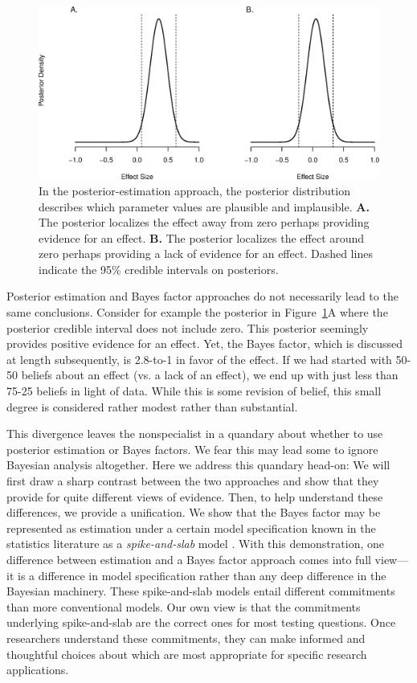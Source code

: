 \begin{figure}
\includegraphics[width=\textwidth]{figs/bi4_fig1}
\caption{In the posterior-estimation approach, the posterior distribution describes which parameter values are plausible and implausible.  \textbf{A.} The posterior localizes the effect away from zero perhaps providing evidence for an effect.  \textbf{B.} The posterior localizes the effect around zero perhaps providing a lack of evidence for an effect.  Dashed lines indicate the 95\% credible intervals on posteriors.}
\label{k:fig}
\end{figure}

Posterior estimation and Bayes factor approaches do not necessarily lead to the same conclusions.  Consider for example the posterior in  Figure~\ref{k:fig}A where the posterior credible interval does not include zero.  This posterior seemingly provides positive evidence for an effect.  Yet, the Bayes factor, which is discussed at length subsequently, is 2.8-to-1 in favor of the effect.  If we had started with 50-50 beliefs about an effect (vs. a lack of an effect), we end up with just less than 75-25 beliefs in light of data.  While this is some revision of belief, this small degree is considered rather modest \cite{Jeffreys:1961,Raftery:1995} rather than substantial.

This divergence leaves the nonspecialist in a quandary about whether to use posterior estimation or Bayes factors.  We fear this may lead some to ignore Bayesian analysis altogether.  Here we address this quandary head-on:  We will first draw a sharp contrast between the two approaches and show that they provide for quite different views of evidence.  Then, to help understand these differences, we provide a unification.  We show that the Bayes factor may be represented as estimation under a certain model specification known in the statistics literature as a {\em spike-and-slab} model \cite{George:McCulloch:1993}.  With this demonstration, one difference between estimation and a Bayes factor approach comes into full view---it is a difference in model specification rather than any deep difference in the Bayesian machinery.  These spike-and-slab models entail different commitments than more conventional models.  Our own view is that the commitments underlying spike-and-slab are the correct ones for most testing questions.    Once researchers understand these commitments, they can make informed and thoughtful choices about which are most appropriate for specific research applications.  

